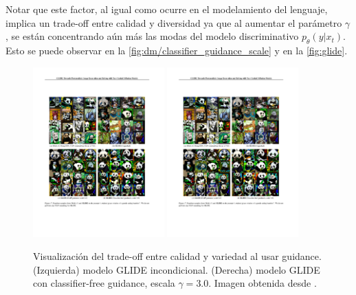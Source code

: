 Notar que este factor, al igual como ocurre en el modelamiento del lenguaje, implica un trade-off entre calidad y diversidad ya que al aumentar el parámetro $\gamma$, se están concentrando aún más las modas del modelo discriminativo $p_\theta(y|x_t)$. Esto se puede observar en la \autoref{fig:dm/classifier_guidance_scale} y en la \autoref{fig:glide}.


\begin{figure}
    \centering
    \includegraphics[width=0.45\textwidth]{images/dm/glide_unconditional}
    \includegraphics[width=0.45\textwidth]{images/dm/glide_guidance}
    \caption{Visualización del trade-off entre calidad y variedad al usar guidance. (Izquierda) modelo GLIDE incondicional. (Derecha) modelo GLIDE con classifier-free guidance, escala $\gamma=3.0$. Imagen obtenida desde \cite{nichol2022glidephotorealisticimagegeneration}.}
    \label{fig:glide}
\end{figure}


